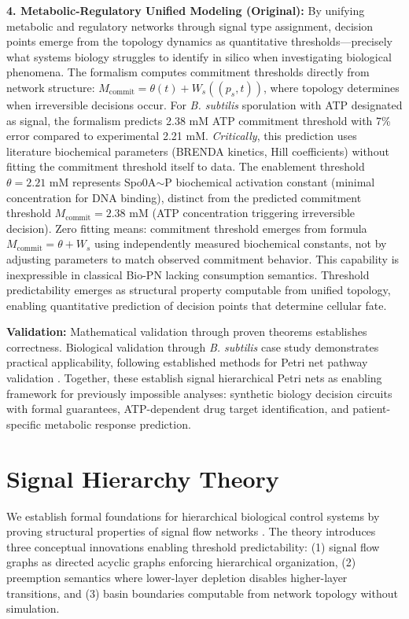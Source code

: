 \documentclass[10pt,letterpaper]{article}
\begin{document}
\textbf{4. Metabolic-Regulatory Unified Modeling (Original):} By unifying metabolic and regulatory networks through signal type assignment, decision points emerge from the topology dynamics as quantitative thresholds---precisely what systems biology struggles to identify in silico when investigating biological phenomena. The formalism computes commitment thresholds directly from network structure: $M_{\text{commit}} = \theta(t) + W_s((p_s,t))$, where topology determines when irreversible decisions occur. For \textit{B. subtilis} sporulation with ATP designated as signal, the formalism predicts 2.38 mM ATP commitment threshold with 7\% error compared to experimental 2.21 mM. \textit{Critically}, this prediction uses literature biochemical parameters (BRENDA kinetics, Hill coefficients) without fitting the commitment threshold itself to data. The enablement threshold $\theta = 2.21$ mM represents Spo0A$\sim$P biochemical activation constant (minimal concentration for DNA binding), distinct from the predicted commitment threshold $M_{\text{commit}} = 2.38$ mM (ATP concentration triggering irreversible decision). Zero fitting means: commitment threshold emerges from formula $M_{\text{commit}} = \theta + W_s$ using independently measured biochemical constants, not by adjusting parameters to match observed commitment behavior. This capability is inexpressible in classical Bio-PN lacking consumption semantics. Threshold predictability emerges as structural property computable from unified topology, enabling quantitative prediction of decision points that determine cellular fate.

\textbf{Validation:} Mathematical validation through proven theorems establishes correctness. Biological validation through \textit{B. subtilis} case study demonstrates practical applicability, following established methods for Petri net pathway validation \cite{heiner2004,koch2005,gilbert2006}. Together, these establish signal hierarchical Petri nets as enabling framework for previously impossible analyses: synthetic biology decision circuits with formal guarantees, ATP-dependent drug target identification, and patient-specific metabolic response prediction.

\section{Signal Hierarchy Theory}

We establish formal foundations for hierarchical biological control systems by proving structural properties of signal flow networks \cite{petri1962,murata1989}. The theory introduces three conceptual innovations enabling threshold predictability: (1) signal flow graphs as directed acyclic graphs enforcing hierarchical organization, (2) preemption semantics where lower-layer depletion disables higher-layer transitions, and (3) basin boundaries computable from network topology without simulation.
\end{document}
